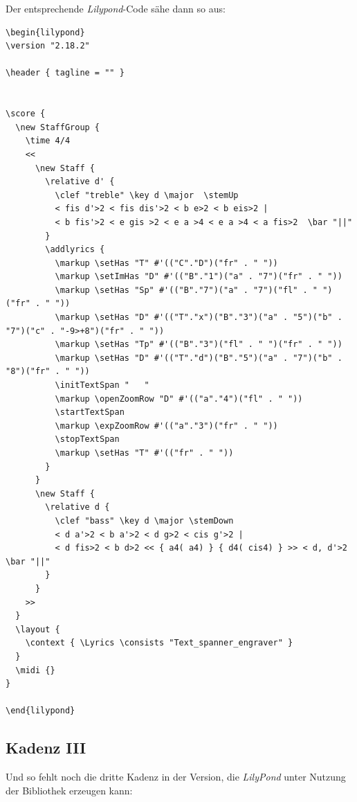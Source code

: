 Der entsprechende \textit{Lilypond}-Code sähe dann so aus:
 \begin{scriptsize}
\begin{verbatim}
\begin{lilypond}
\version "2.18.2"

\header { tagline = "" }

  
\score {
  \new StaffGroup {
    \time 4/4
    <<
      \new Staff {
        \relative d' {
          \clef "treble" \key d \major  \stemUp
          < fis d'>2 < fis dis'>2 < b e>2 < b eis>2 | 
          < b fis'>2 < e gis >2 < e a >4 < e a >4 < a fis>2  \bar "||"
        }
        \addlyrics {
          \markup \setHas "T" #'(("C"."D")("fr" . " "))
          \markup \setImHas "D" #'(("B"."1")("a" . "7")("fr" . " "))
          \markup \setHas "Sp" #'(("B"."7")("a" . "7")("fl" . " ")("fr" . " "))
          \markup \setHas "D" #'(("T"."x")("B"."3")("a" . "5")("b" . "7")("c" . "-9>+8")("fr" . " "))
          \markup \setHas "Tp" #'(("B"."3")("fl" . " ")("fr" . " ")) 
          \markup \setHas "D" #'(("T"."d")("B"."5")("a" . "7")("b" . "8")("fr" . " "))                  
          \initTextSpan "   "
          \markup \openZoomRow "D" #'(("a"."4")("fl" . " "))
          \startTextSpan
          \markup \expZoomRow #'(("a"."3")("fr" . " ")) 
          \stopTextSpan  
          \markup \setHas "T" #'(("fr" . " "))
        }   
      }
      \new Staff {
        \relative d { 
          \clef "bass" \key d \major \stemDown
          < d a'>2 < b a'>2 < d g>2 < cis g'>2 |
          < d fis>2 < b d>2 << { a4( a4) } { d4( cis4) } >> < d, d'>2 \bar "||"
        }   
      }
    >>
  }
  \layout {
    \context { \Lyrics \consists "Text_spanner_engraver" }
  }
  \midi {}
}

\end{lilypond}
\end{verbatim}
\end{scriptsize}

\subsection{Kadenz III}

Und so fehlt noch die dritte Kadenz in der Version, die \textit{LilyPond} unter
Nutzung der Bibliothek  erzeugen kann:

